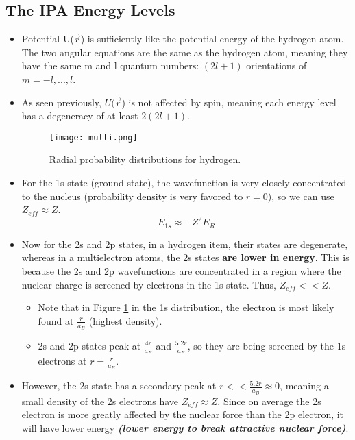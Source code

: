\documentclass[12pt, letterpaper, twoside]{article}
\begin{document}
\subsection{The IPA Energy Levels}

\begin{itemize}
    \item Potential U($\vec{r}$) is sufficiently like the potential energy of the hydrogen atom. The two angular equations are the same as the hydrogen atom, meaning they have the same m and l quantum numbers:  $(2l+1)$ orientations of $m = {-l, ..., l}$.
    \item As seen previously, $U(\vec{r}$) is not affected by spin, meaning each energy level has a degeneracy of at least $2(2l+1)$.
    \begin{figure}[!ht]
        \centering
        \texttt{[image: multi.png]}
        \caption{Radial probability distributions for hydrogen.}
        \label{fig:radial}
    \end{figure}
    \item For the 1s state (ground state), the wavefunction is very closely concentrated to the nucleus (probability density is very favored to $r = 0$), so we can use $Z_{eff} \approx Z$.
    \begin{equation*}
        E_{1s} \approx -Z^2E_R
    \end{equation*}
    \item Now for the 2s and 2p states, in a hydrogen item, their states are degenerate, whereas in a multielectron atoms, the 2s states \textbf{are lower in energy}. This is because the 2s and 2p wavefunctions are concentrated in a region where the nuclear charge is screened by electrons in the 1s state. Thus, $Z_{eff} << Z$.
    \begin{itemize}
        \item Note that in Figure \ref{fig:radial} in the 1s distribution, the electron is most likely found at $\frac{r}{a_B}$ (highest density).
        \item 2s and 2p states peak at $\frac{4r}{a_B}$ and $\frac{5.2r}{a_B}$, so they are being screened by the 1s electrons at $r = \frac{r}{a_B}$.
    \end{itemize}
    \item However, the 2s state has a secondary peak at $r << \frac{5.2r}{a_B} \approx 0$, meaning a small density of the 2s electrons have $Z_{eff} \approx Z$. Since on average the 2s electron is more greatly affected by the nuclear force than the 2p electron, it will have lower energy \textbf{\textit{(lower energy to break attractive nuclear force)}}.

\end{itemize}
\end{document}
